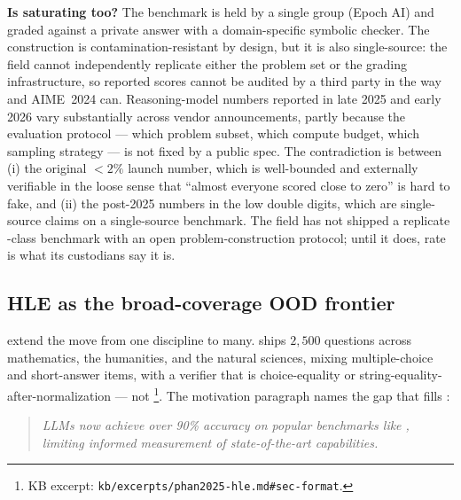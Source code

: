 \begin{contradiction}
\textbf{Is  saturating too?} The benchmark is held by a
single group (Epoch AI) and graded against a private answer  with
a domain-specific symbolic checker. The construction is
contamination-resistant by design, but it is also single-source: the
field cannot independently replicate either the problem set or the
grading infrastructure, so reported  scores cannot be
audited by a third party in the way  and AIME~2024 can.
Reasoning-model  numbers reported in late 2025 and early
2026 vary substantially across vendor announcements, partly because
the evaluation protocol --- which problem subset, which compute
budget, which sampling strategy --- is not fixed by a public spec.
The contradiction is between (i) the original $<\!2\%$ launch
number, which is well-bounded and externally verifiable in the loose
sense that ``almost everyone scored close to zero'' is hard to fake,
and (ii) the post-2025 numbers in the low double digits, which are
single-source claims on a single-source benchmark. The field has not
shipped a replicate -class benchmark with an open
problem-construction protocol; until it does, 
 rate is what its custodians say it is.
\end{contradiction}

\subsection{HLE as the broad-coverage OOD frontier}
\label{sec:reasoning-hle}

\citet{phan2025-hle} extend the  move from one
discipline to many.  ships $2{,}500$ questions
across mathematics, the humanities, and the natural sciences,
mixing multiple-choice and short-answer items, with a verifier that
is choice-equality or string-equality-after-normalization --- not
%
\footnote{KB excerpt: \nolinkurl{kb/excerpts/phan2025-hle.md#sec-format}.}.
The motivation paragraph names the gap that  fills
\citep[\S{}abstract]{phan2025-hle}:

\begin{quote}\itshape
LLMs now achieve over 90\% accuracy on popular benchmarks like ,
limiting informed measurement of state-of-the-art  capabilities.
\end{quote}

